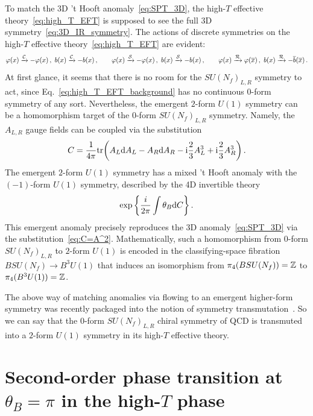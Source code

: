 \documentclass[
 reprint,







nofootinbib,


 amsmath,amssymb,
 aps,
 prd






tightenlines
]{revtex4-2}
\begin{document}
To match the 3D 't Hooft anomaly~\eqref{eq:SPT_3D}, the high-$T$ effective theory~\eqref{eq:high_T_EFT} is supposed to see the full 3D symmetry~\eqref{eq:3D_IR_symmetry}.
The actions of discrete symmetries on the high-$T$ effective theory~\eqref{eq:high_T_EFT} are evident:
\begin{equation}
    \varphi(x)\xrightarrow{\mathcal{C}}-\varphi(x)\,,\
    b(x)\xrightarrow{\mathcal{C}}-b(x)\,,\qquad
    \varphi(x)\xrightarrow{\mathcal{S}}-\varphi(x)\,,\
    b(x)\xrightarrow{\mathcal{S}}-b(x)\,,\qquad
    \varphi(x)\xrightarrow{\mathcal{R}}\varphi(\overline{x})\,,\
    b(x)\xrightarrow{\mathcal{R}}-\overline{b}(\overline{x})\,.
\end{equation}
At first glance, it seems that there is no room for the $SU(N_f)_{L,R}$ symmetry to act, since Eq.~\eqref{eq:high_T_EFT_background} has no continuous 0-form symmetry of any sort.
Nevertheless, the emergent $2$-form $U(1)$ symmetry can be a homomorphism target of the $0$-form $SU(N_f)_{L,R}$ symmetry.
Namely, the $A_{L,R}$ gauge fields can be coupled via the substitution
\begin{equation}\label{eq:C=A^2}
    C = \frac{1}{4\pi}\mathrm{tr}\!\left( A_L \mathrm{d} A_L - A_R \mathrm{d} A_R
    - \mathrm{i}\frac{2}{3} A_L^3 + \mathrm{i}\frac{2}{3} A_R^3 \right).
\end{equation}
The emergent $2$-form $U(1)$ symmetry has a mixed 't Hooft anomaly with the $(-1)$-form $U(1)$ symmetry, described by the 4D invertible theory
\begin{equation}\label{eq:high_T_anomaly}
    \exp\left\{\frac{i}{2\pi}\int\theta_B\mathrm{d} C\right\}.
\end{equation}
This emergent anomaly precisely reproduces the 3D anomaly~\eqref{eq:SPT_3D} via the substitution~\eqref{eq:C=A^2}.
Mathematically, such a homomorphism from $0$-form $SU(N_f)_{L,R}$ to $2$-form $U(1)$ is encoded in the classifying-space fibration $BSU(N_f)\to B^3U(1)$ that induces an isomorphism from $\pi_4(BSU(N_f))=\mathbb{Z}$ to $\pi_4(B^3U(1))=\mathbb{Z}$.

The above way of matching anomalies via flowing to an emergent higher-form symmetry was recently packaged into the notion of symmetry transmutation~\cite{Seiberg:2025bqy}.
So we can say that the $0$-form $SU(N_f)_{L,R}$ chiral symmetry of QCD is transmuted into a $2$-form $U(1)$ symmetry in its high-$T$ effective theory.





\section[Second-order phase transition at theta=pi in the high-T phase]{Second-order phase transition at $\theta_B=\pi$ in the high-$T$ phase}
\label{sec:anomalons}
\end{document}

